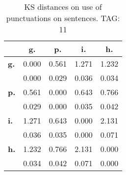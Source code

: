 \begin{table}[h!]
\begin{center}
\begin{tabular}{| l || c | c | c | c |}\hline
 & {\bf g.} & {\bf p.} & {\bf i.} & {\bf h.} \\\hline\hline
{\bf g.} & 0.000 & 0.561 & 1.271 & 1.232 \\
{\bf } & 0.000 & 0.029 & 0.036 & 0.034 \\\hline
{\bf p.} & 0.561 & 0.000 & 0.643 & 0.766 \\
{\bf } & 0.029 & 0.000 & 0.035 & 0.042 \\\hline
{\bf i.} & 1.271 & 0.643 & 0.000 & 2.131 \\
{\bf } & 0.036 & 0.035 & 0.000 & 0.071 \\\hline
{\bf h.} & 1.232 & 0.766 & 2.131 & 0.000 \\
{\bf } & 0.034 & 0.042 & 0.071 & 0.000 \\\hline
\end{tabular}
\caption{KS distances on use of punctuations on sentences. TAG: 11}
\end{center}
\end{table}